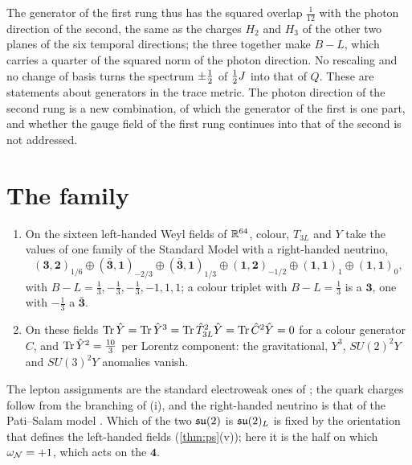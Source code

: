 The generator of the first rung thus has the squared overlap $\tfrac1{12}$ with the photon direction of the second, the same as the charges
$H_2$ and $H_3$ of the other two planes of the six temporal directions; the three together make $B\!-\!L$, which carries a quarter of the
squared norm of the photon direction. No rescaling and no change of basis turns the spectrum $\pm\tfrac12$ of $\tfrac12 J$ into that of $Q$. These
are statements about generators in the trace metric. The photon direction of the second rung is a new combination, of which the generator
of the first is one part, and whether the gauge field of the first rung continues into that of the second is not addressed.

\section{The family}

\begin{theorem}
\label{thm:family}
\begin{enumerate}[label=(\roman*),leftmargin=2.2em,itemsep=1pt]
\item On the sixteen left-handed Weyl fields of $\mathbb{R}^{64}$, colour, $T_{3L}$ and $Y$ take the values of one family of the Standard Model
with a right-handed neutrino,
\[
(\mathbf3,\mathbf2)_{1/6}\oplus(\bar{\mathbf3},\mathbf1)_{-2/3}\oplus(\bar{\mathbf3},\mathbf1)_{1/3}\oplus(\mathbf1,\mathbf2)_{-1/2}\oplus
(\mathbf1,\mathbf1)_{1}\oplus(\mathbf1,\mathbf1)_{0},
\]
with $B\!-\!L=\tfrac13,-\tfrac13,-\tfrac13,-1,1,1$; a colour triplet with $B\!-\!L=\tfrac13$ is a $\mathbf3$, one with $-\tfrac13$ a
$\bar{\mathbf3}$.
\item On these fields $\operatorname{Tr}\hat Y=\operatorname{Tr}\hat Y^3=\operatorname{Tr}\hat T_{3L}^2\hat Y=\operatorname{Tr}\hat C^2\hat Y=0$ for a colour generator $C$, and
$\operatorname{Tr}\hat Y^2=\tfrac{10}3$ per Lorentz component:
the gravitational, $Y^3$, $SU(2)^2Y$ and $SU(3)^2Y$ anomalies vanish.
\end{enumerate}
\end{theorem}

The lepton assignments are the standard electroweak ones of \cite{Glashow61,Weinberg67}; the quark charges follow from the branching of
(i), and the right-handed neutrino is that of the Pati--Salam model \cite{PatiSalam}. Which of the two $\mathfrak{su}(2)$ is $\mathfrak{su}(2)_L$ is
fixed by the orientation that defines the left-handed fields (\cref{thm:ps}(v)); here it is the half on which $\omega_\mathcal N=+1$, which acts on
the $\mathbf4$.

